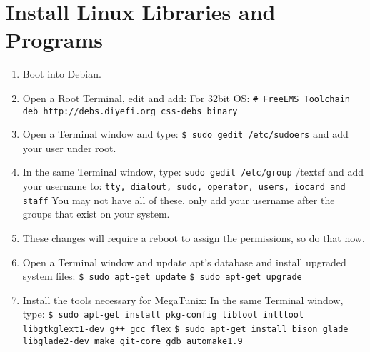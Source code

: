 \documentclass[12pt,notitlepage,onecolumn,oneside,openany]{memoir}
\begin{document}
\chapter{\textsf{Install Linux Libraries and Programs}}

\begin{enumerate}
\item \textsf{Boot into Debian.}
\item \textsf{Open a Root Terminal, edit  and add:} \newline
	\textsf{For 32bit OS:} \newline
\texttt{\# FreeEMS Toolchain} \newline
\texttt{deb http://debs.diyefi.org css-debs binary}

\item \textsf{Open a Terminal window and type:} \newline
      \texttt{\$ sudo gedit /etc/sudoers} \newline
      \textsf{and add your user under root.}

\item \textsf{In the same Terminal window, type:} \newline
      \texttt{sudo gedit /etc/group} /textsf{ and add your username to:} \newline
      \texttt{tty, dialout, sudo, operator, users, iocard and staff} \newline
      \textsf{You may not have all of these, only add your username after the groups that exist on your system.}

\item \textsf{These changes will require a reboot to assign the permissions, so do that now.}

\item \textsf{Open a Terminal window and update apt's database and install upgraded system files:} \newline
      \texttt{\$ sudo apt-get update} \newline
      \texttt{\$ sudo apt-get upgrade}

\item \textsf{Install the tools necessary for MegaTunix:} \newline
      \textsf{In the same Terminal window, type:} \newline
      \texttt{\$ sudo apt-get install pkg-config libtool intltool libgtkglext1-dev g++ gcc flex} \newline
      \texttt{\$ sudo apt-get install bison glade libglade2-dev make git-core gdb automake1.9}


\end{enumerate}
\end{document}
